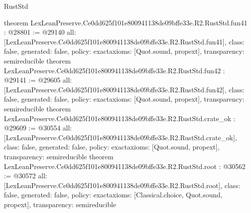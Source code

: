\begin{lexlean}{RustStd}
\begin{coremodule}
{}
theorem LexLeanPreserve.Ce0dd625f101e800941138de09bffe33e.R2.RustStd.fun41 : @28801 := @29140 {
  all: [LexLeanPreserve.Ce0dd625f101e800941138de09bffe33e.R2.RustStd.fun41],
  class: false,
  generated: false,
  policy: exact{axioms: [Quot.sound, propext]},
  transparency: semireducible
}
theorem LexLeanPreserve.Ce0dd625f101e800941138de09bffe33e.R2.RustStd.fun42 : @29141 := @29605 {
  all: [LexLeanPreserve.Ce0dd625f101e800941138de09bffe33e.R2.RustStd.fun42],
  class: false,
  generated: false,
  policy: exact{axioms: [Quot.sound, propext]},
  transparency: semireducible
}
theorem LexLeanPreserve.Ce0dd625f101e800941138de09bffe33e.R2.RustStd.crate_ok : @29609 := @30554 {
  all: [LexLeanPreserve.Ce0dd625f101e800941138de09bffe33e.R2.RustStd.crate_ok],
  class: false,
  generated: false,
  policy: exact{axioms: [Quot.sound, propext]},
  transparency: semireducible
}
theorem LexLeanPreserve.Ce0dd625f101e800941138de09bffe33e.R2.RustStd.root : @30562 := @30572 {
  all: [LexLeanPreserve.Ce0dd625f101e800941138de09bffe33e.R2.RustStd.root],
  class: false,
  generated: false,
  policy: exact{axioms: [Classical.choice, Quot.sound, propext]},
  transparency: semireducible
}


\end{coremodule}
\end{lexlean}
